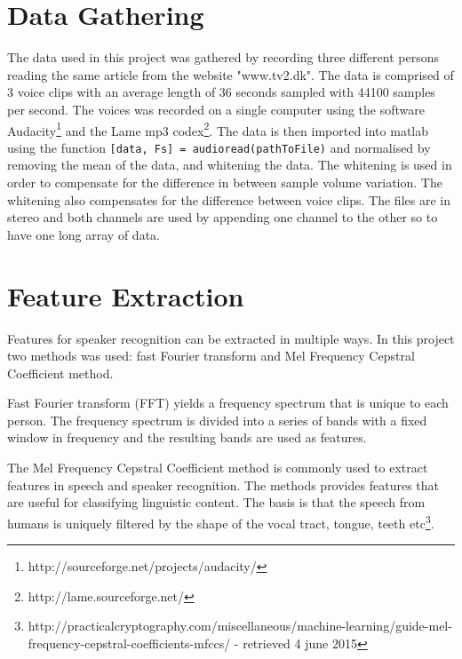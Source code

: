 \section{Data Gathering}
The data used in this project was gathered by recording three different persons reading the same article from the website "www.tv2.dk". The data is comprised of 3 voice clips with an average length of 36 seconds sampled with 44100 samples per second. The voices was recorded on a single computer using the software Audacity\footnote{http://sourceforge.net/projects/audacity/} and the Lame mp3 codex\footnote{http://lame.sourceforge.net/}. The data is then imported into matlab using the function \texttt{[data, Fs] = audioread(pathToFile)} and normalised by removing the mean of the data, and whitening the data. The whitening is used in order to compensate for the difference in between sample volume variation. The whitening also compensates for the difference between voice clips. The files are in stereo and both channels are used by appending one channel to the other so to have one long array of data.

\section{Feature Extraction}
Features for speaker recognition can be extracted in multiple ways. In this project two methods was used: fast Fourier transform and Mel Frequency Cepstral Coefficient method.

Fast Fourier transform (FFT) yields a frequency spectrum that is unique to each person. The frequency spectrum is divided into a series of bands with a fixed window in frequency and the resulting bands are used as features. 

The Mel Frequency Cepstral Coefficient method is commonly used to extract features in speech and speaker recognition. The methods provides features that are useful for classifying linguistic content. The basis is that the speech from humans is uniquely filtered by the shape of the vocal tract, tongue, teeth etc\footnote{http://practicalcryptography.com/miscellaneous/machine-learning/guide-mel-frequency-cepstral-coefficients-mfccs/ - retrieved 4 june 2015}. 

